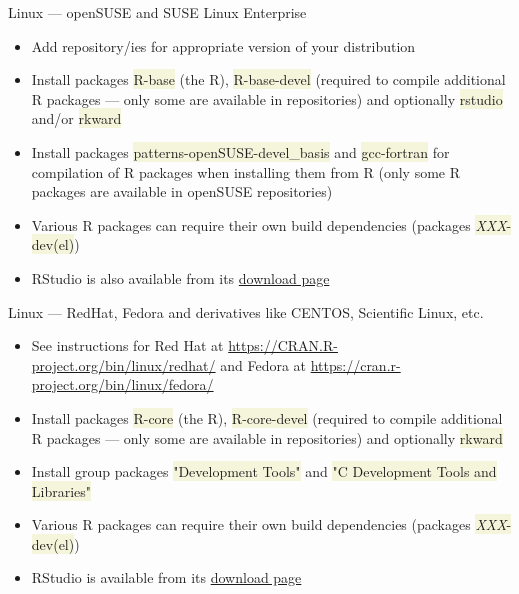 \documentclass[compress, xelatex, 11pt, xcolor=svgnames, aspectratio=169, url={hyphens, lowtilde}]{beamer}
\renewcommand{\texttt}[1]{\colorbox{Beige}{{\ttfamily #1}}}
\begin{document}
\begin{frame}{Linux --- openSUSE and SUSE Linux Enterprise}
	\begin{itemize}
		\item Add repository/ies for appropriate version of your distribution
		\begin{itemize}
		\end{itemize}
		\item Install packages \texttt{R-base} (the R), \texttt{R-base-devel} (required to compile additional R packages --- only some are available in repositories) and optionally \texttt{rstudio} and/or \texttt{rkward}
		\item Install packages \texttt{patterns-openSUSE-devel\_basis} and \texttt{gcc-fortran} for compilation of R packages when installing them from R (only some R packages are available in openSUSE repositories)
		\item Various R packages can require their own build dependencies (packages \texttt{\textit{XXX}-dev(el)})
		\item RStudio is also available from its \href{https://posit.co/products/open-source/rstudio/}{download page}
	\end{itemize}
\end{frame}

\begin{frame}{Linux --- RedHat, Fedora and derivatives like CENTOS, Scientific Linux, etc.}
	\begin{itemize}
		\item See instructions for Red Hat at \url{https://CRAN.R-project.org/bin/linux/redhat/} and Fedora at \url{https://cran.r-project.org/bin/linux/fedora/}
		\item Install packages \texttt{R-core} (the R), \texttt{R-core-devel} (required to compile additional R packages --- only some are available in repositories) and optionally \texttt{rkward}
		\item Install group packages \texttt{"Development Tools"} and \texttt{"C Development Tools and Libraries"}
		\item Various R packages can require their own build dependencies (packages \texttt{\textit{XXX}-dev(el)})
		\item RStudio is available from its \href{https://posit.co/products/open-source/rstudio/}{download page}
	\end{itemize}
\end{frame}
\end{document}
